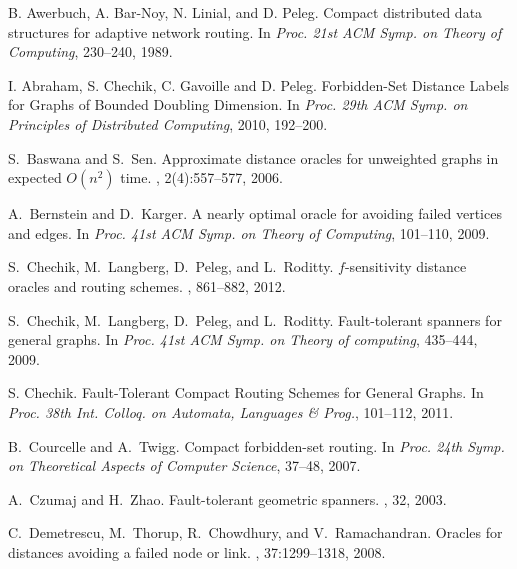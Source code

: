 \documentclass[12pt]{article}
\begin{document}
\begin{thebibliography}{10}



B. Awerbuch, A. {Bar-Noy}, N. Linial, and D. Peleg.
\newblock Compact distributed data structures for adaptive network routing.
\newblock
In {\em Proc. 21st ACM Symp. on Theory of Computing},
230--240, 1989.






I. Abraham, S. Chechik, C. Gavoille and D. Peleg.
\newblock Forbidden-Set Distance Labels for Graphs of Bounded Doubling
Dimension.
\newblock
In {\em Proc. 29th ACM Symp. on Principles of Distributed Computing},
2010, 192--200.


S.~Baswana and S.~Sen.
\newblock Approximate distance oracles for unweighted graphs in expected
  {$O(n^2)$} time.
, 2(4):557--577, 2006.


A.~Bernstein and D.~Karger.
\newblock A nearly optimal oracle for avoiding failed vertices and edges.
\newblock
In {\em Proc. 41st ACM Symp. on Theory of Computing},
101--110, 2009.


S.~Chechik, M.~Langberg, D.~Peleg, and L.~Roditty.
\newblock $f$-sensitivity distance oracles and routing schemes.
, 861--882, 2012.

S.~Chechik, M.~Langberg, D.~Peleg, and L.~Roditty.
\newblock Fault-tolerant spanners for general graphs.
\newblock
In {\em Proc. 41st ACM Symp. on Theory of computing},
435--444, 2009.

S. Chechik.
\newblock Fault-Tolerant Compact Routing Schemes for General Graphs.
\newblock
In {\em Proc. 38th Int. Colloq. on Automata, Languages \& Prog.},
101--112, 2011.



B.~Courcelle and A.~Twigg.
\newblock Compact forbidden-set routing.
\newblock
In {\em Proc. 24th Symp. on Theoretical Aspects of Computer Science},
37--48, 2007.

A.~Czumaj and H.~Zhao.
\newblock Fault-tolerant geometric spanners.
, 32, 2003.

C.~Demetrescu, M.~Thorup, R.~Chowdhury, and V.~Ramachandran.
\newblock Oracles for distances avoiding a failed node or link.
, 37:1299--1318, 2008.


\end{thebibliography}
\end{document}
